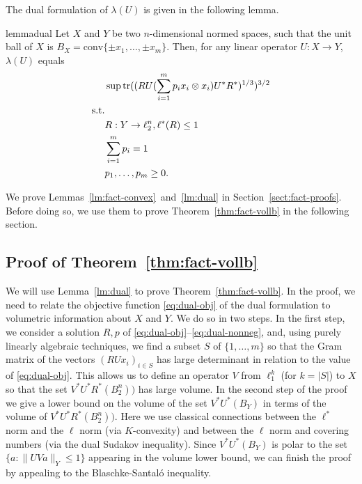 The dual formulation of $\lambda(U)$ is given in the following lemma. 
\begin{restatable}{lemma}{dual}
  \label{lm:dual}
  Let $X$ and $Y$ be two $n$-dimensional normed spaces, such that the
  unit ball of $X$ is $B_X = \mathrm{conv}\{\pm x_1, \ldots, \pm
  x_m\}$. Then, for any linear operator $U:X \to Y$, $\lambda(U)$
  equals
  \begin{align}
    &\sup \operatorname{tr}((RU(\sum_{i = 1}^m{p_i x_i \otimes  x_i})U^*R^*)^{1/3})^{3/2}\label{eq:dual-obj}\\
    \text{s.t.}\notag\\
    &R: Y \to \ell_2^n, \ell^*(R) \le 1 \label{eq:dual-ellstar}\\
    &\sum_{i = 1}^m{p_i} = 1\label{eq:dual-prob}\\
    &p_1, \ldots, p_m \ge 0. \label{eq:dual-nonneg}
  \end{align}
\end{restatable}

We prove Lemmas~\ref{lm:fact-convex}~and~\ref{lm:dual} in
Section~\ref{sect:fact-proofs}. Before doing so, we use them to prove
Theorem~\ref{thm:fact-vollb} in the following section. 

\subsection{Proof of Theorem~\ref{thm:fact-vollb}}
\label{sect:fact-pf}

We will use Lemma~\ref{lm:dual} to prove Theorem~\ref{thm:fact-vollb}.
In the proof, we need to relate the objective function
\eqref{eq:dual-obj} of the dual formulation to volumetric information
about $X$ and $Y$. We do so in two steps. In the first step, we
consider a solution $R, p$ of
\eqref{eq:dual-obj}--\eqref{eq:dual-nonneg}, and, using purely
linearly algebraic techniques, we find a subset $S$ of $\{1, \ldots,
m\}$ so that the Gram matrix of the vectors $(RUx_i)_{i \in S}$ has large
determinant  in relation to the value of
\eqref{eq:dual-obj}. This allows us to define an operator $V$ from
$\ell_1^k$ (for  $k = |S|$) to $X$ so that the set
$V^*U^*R^*(B_2^n))$ has large volume. In the second step of the proof
we give a lower bound on the volume of the set $V^*U^*(B_Y)$ in terms
of the volume of $V^*U^*R^*(B_2^n))$. Here we use classical
connections between the $\ell^*$ norm and the $\ell$ norm (via
$K$-convexity) and between the $\ell$ norm and covering numbers (via
the dual Sudakov inequality). Since $V^*U^*(B_Y)$ is polar to the set
$\{a: \|UVa\|_Y \le 1\}$ appearing in the volume lower bound, we can
finish the proof by appealing to the Blaschke-Santal\'o inequality.



